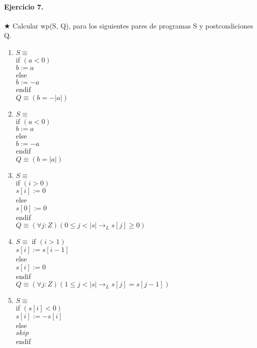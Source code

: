 \documentclass{article}
\begin{document}
                                                            
\paragraph{Ejercicio 7.} $\bigstar$ Calcular wp(S, Q), para los siguientes pares de programas S y postcondiciones Q.

\begin{enumerate}[label=\alph*)]
\item $S \equiv$\\
   if $( a < 0 )$\\
      $b := a$\\
   else\\
      $b := -a$\\
   endif\\

   $Q \equiv (b = -|a|)$\\
\item $S \equiv$\\
   if $( a < 0 )$\\
     $ b := a$\\
   else\\
     $ b := -a$\\
   endif\\

   $Q \equiv (b = |a|)$\\

\item $S \equiv$\\
   if $( i > 0 )$\\
     $ s [ i ] := 0$\\
   else\\
     $ s [ 0 ] := 0$\\
   endif\\

   $Q \equiv (\forall j :Z)(0 \leq j < |s| \rightarrow_L s[j] \geq 0)$\\
\item $S \equiv$
   if $( i > 1 )$\\
      $s [ i ] := s [ i -1]$\\
   else\\
     $ s [ i ] := 0$\\
   endif\\

   $Q \equiv (\forall j :Z)(1 \leq j < |s| \rightarrow_L s[j] = s[j - 1])$\\

\item $S \equiv$\\
   if $( s [ i ] < 0 )$\\
     $ s [ i ] := -s [ i ]$\\
   else\\
      $skip$\\
   endif\\


\end{enumerate}
\end{document}
